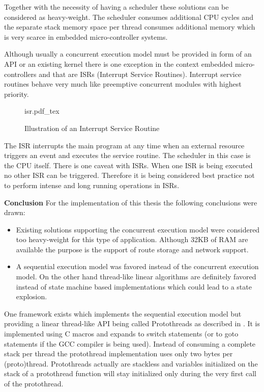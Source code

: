 Together with the necessity of having a scheduler these solutions can be considered as heavy-weight. The scheduler consumes additional CPU cycles and the separate stack memory space per thread consumes additional memory which is very scarce in embedded micro-controller systems.

Although usually a concurrent execution model must be provided in form of an API or an existing kernel there is one exception in the context embedded micro-controllers and that are ISRs (Interrupt Service Routines). Interrupt service routines behave very much like preemptive concurrent modules with highest priority.

\begin{figure}[H]
\centering
{isr.pdf_tex}
\caption[]{Illustration of an Interrupt Service Routine}
\end{figure}

The ISR interrupts the main program at any time when an external resource triggers an event and executes the service routine. The scheduler in this case is the CPU itself. There is one caveat with ISRs. When one ISR is being executed no other ISR can be triggered. Therefore it is being considered best practice not to perform intense and long running operations in ISRs.

\textbf{Conclusion}
For the implementation of this thesis the following conclusions were drawn:

\begin{itemize}
\item Existing solutions supporting the concurrent execution model were considered too heavy-weight for this type of application. Although 32KB of RAM are available the purpose is the support of route storage and network support.
\item A sequential execution model was favored instead of the concurrent execution model. On the other hand thread-like linear algorithms are definitely favored instead of state machine based implementations which could lead to a state explosion.
\end{itemize}

One framework exists which implements the sequential execution model but providing a linear thread-like API being called Protothreads as described in \cite{dunkels}. It is implemented using C macros and expands to switch statements (or to goto statements if the GCC compiler is being used). Instead of consuming a complete stack per thread the protothread implementation uses only two bytes per (proto)thread. Protothreads actually are stackless and variables initialized on the stack of a protothread function will stay initialized only during the very first call of the protothread.

